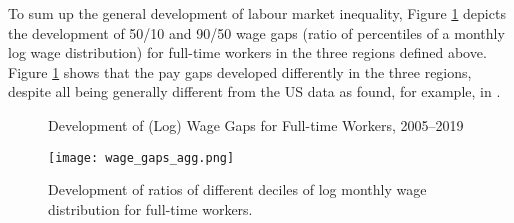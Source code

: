 \documentclass[11pt]{article}
\begin{document}


To sum up the general development of labour market inequality, Figure \ref{agg_wage_gaps_CEE} depicts the development of  50/10 and 90/50 wage gaps (ratio of percentiles of a monthly log wage distribution) for full-time workers in the three regions defined above.
Figure \ref{agg_wage_gaps_CEE} shows that the pay gaps developed differently in the three regions, despite all being generally different from the US data as found, for example, in \citet{mishel2013assessing}. 

\begin{figure}[!htbp]%
    \centering
    \caption{Development of (Log) Wage Gaps for Full-time Workers,  2005–2019}
    {\texttt{[image: wage\_gaps\_agg.png]} }
    \label{agg_wage_gaps_CEE}
    \caption*{\footnotesize Development of ratios of different deciles of log monthly wage distribution for full-time workers. }
\end{figure}
\end{document}
